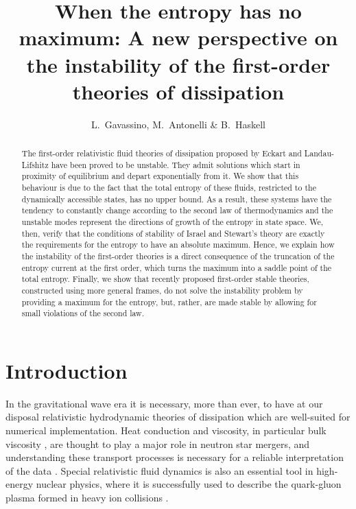 \documentclass[a4paper, amsfonts, amssymb, amsmath, reprint, showkeys, nofootinbib, twoside]{revtex4-1}
\begin{document}
\title{When the entropy has no maximum: A new perspective on the instability of the first-order theories of dissipation}
\author{L.~Gavassino, M.~Antonelli \& B.~Haskell}


\begin{abstract}
The first-order relativistic fluid theories of dissipation proposed by Eckart and Landau-Lifshitz have been proved to be unstable. They admit solutions which start in proximity of equilibrium and depart exponentially from it. We show that this behaviour is due to the fact that the total entropy of these fluids, restricted to the dynamically accessible states, has no upper bound. As a result, these systems have the tendency to constantly change according to the second law of thermodynamics and the unstable modes represent the directions of growth of the entropy in state space. We, then, verify that the conditions of stability of Israel and Stewart's theory are exactly the requirements for the entropy to have an absolute maximum. 
Hence, we explain how the instability of the first-order theories is a direct consequence of the truncation of the entropy current at the first order, which turns the maximum into a saddle point of the total entropy. Finally, we show that recently proposed first-order stable theories, constructed using more general frames, do not solve the instability problem by providing a maximum for the entropy, but, rather, are made stable by allowing for small violations of the second law.
\end{abstract} 



\maketitle




\section{Introduction} 


In the gravitational wave era \citep{AbbottNS1} it is necessary, more than ever, to have at our disposal relativistic hydrodynamic theories of dissipation which are well-suited for numerical implementation. Heat conduction and viscosity, in particular bulk viscosity \citep{AlfordRezzolla}, are thought to play a major role in neutron star mergers, and understanding these transport processes is necessary for a reliable interpretation of the data \citep{RadiceEjecta, RadiceEjecta2}. Special relativistic fluid dynamics is also an essential tool in high-energy nuclear physics, where it is successfully used to describe the quark-gluon plasma formed in heavy ion collisions \citep{Romatschke2017ejr}. 
\end{document}
